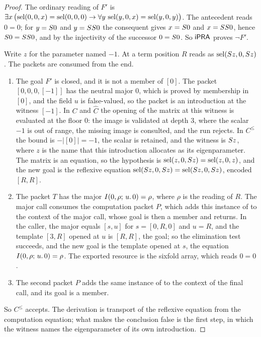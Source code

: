 \begin{proof}
The ordinary reading of $F'$ is
$\exists x\,\bigl(\operatorname{sel}(0,0,x)=\operatorname{sel}(0,0,0)\to\forall y\,\operatorname{sel}(y,0,x)=\operatorname{sel}(y,0,y)\bigr)$.
The antecedent reads $0=0$; for $y=S 0$ and $y=SS 0$ the consequent
gives $x=S 0$ and $x=SS 0$, hence $S 0=SS 0$, and by the
injectivity of the successor $0=S 0$. So $\mathsf{iPRA}$ proves $\neg F'$.

Write $z$ for the parameter named $-1$. At a term position $R$ reads as
$\operatorname{sel}(S z,0,S z)$. The packets are consumed from the end.
\begin{enumerate}
\item The goal $F'$ is closed, and it is not a member of $[0]$. The packet
$[0,0,0,[-1]]$ has the neutral major $0$, which is proved by membership in
$[0]$, and the field $u$ is false-valued, so the packet is an introduction at
the witness $[-1]$. In $C$ and $\widehat C$ the opening of the matrix at this
witness is evaluated at the floor $0$: the image is validated at depth $3$,
where the scalar $-1$ is out of range, the missing image is consulted, and
the run rejects. In $C^{\le}$ the bound is $-\lvert[0]\rvert=-1$, the scalar
is retained, and the witness is $S z$, where $z$ is the name that this
introduction allocates as its eigenparameter. The matrix is an equation, so
the hypothesis is $\operatorname{sel}(z,0,S z)=\operatorname{sel}(z,0,z)$, and the new goal is the
reflexive equation $\operatorname{sel}(S z,0,S z)=\operatorname{sel}(S z,0,S z)$, encoded
$[R,R]$.
\item The packet $T$ has the major $I(0,\rho;\,u.\,0)=\rho$, where $\rho$ is
the reading of $R$. The major call consumes the computation packet $P$, which
adds this instance of  to the context of the major call, whose
goal is then a member and returns. In the caller, the major equals
$[s,u]$ for $s=[0,R,0]$ and $u=R$, and the template $[3,R]$ opened at $u$ is
$[R,R]$, the goal; so the elimination test succeeds, and the new goal is the
template opened at $s$, the equation $I(0,\rho;\,u.\,0)=\rho$. The exported
resource is the sixfold array, which reads $0=0$.
\item The second packet $P$ adds the same instance of  to the
context of the final call, and its goal is a member.
\end{enumerate}
So $C^{\le}$ accepts. The derivation is transport of the reflexive equation
from the computation equation; what makes the conclusion false is the first
step, in which the witness names the eigenparameter of its own introduction.
\end{proof}

